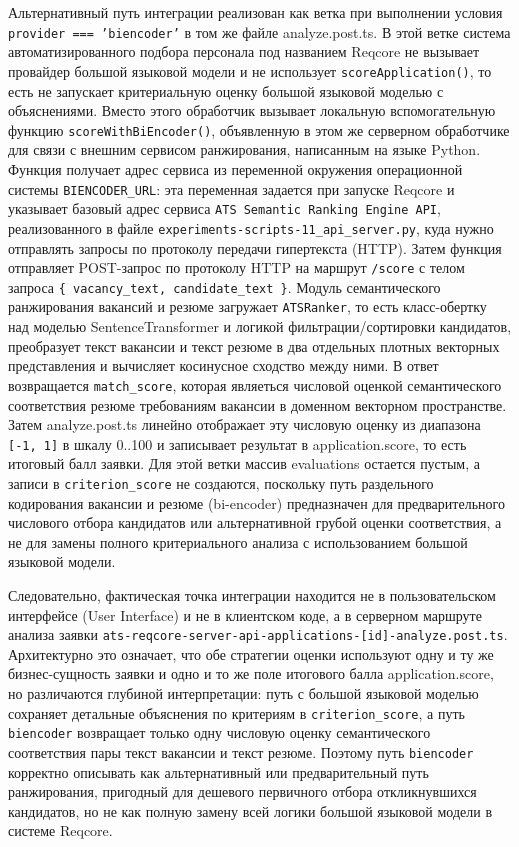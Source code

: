 Альтернативный путь интеграции реализован как ветка при выполнении условия \texttt{provider === 'biencoder'} в том же файле analyze.post.ts. В этой ветке система автоматизированного подбора персонала под названием Reqcore не вызывает провайдер большой языковой модели и не использует \texttt{scoreApplication()}, то есть не запускает критериальную оценку большой языковой моделью с объяснениями. Вместо этого обработчик вызывает локальную вспомогательную функцию \texttt{scoreWithBiEncoder()}, объявленную в этом же серверном обработчике для связи с внешним сервисом ранжирования, написанным на языке Python. Функция получает адрес сервиса из переменной окружения операционной системы \texttt{BIENCODER\_URL}: эта переменная задается при запуске Reqcore и указывает базовый адрес сервиса \texttt{ATS Semantic Ranking Engine API}, реализованного в файле \texttt{experiments-scripts-11\_api\_server.py}, куда нужно отправлять запросы по протоколу передачи гипертекста (HTTP). Затем функция отправляет POST-запрос по протоколу HTTP на маршрут \texttt{{\slash}score} с телом запроса \texttt{\{ vacancy\_text, candidate\_text \}}. Модуль семантического ранжирования вакансий и резюме загружает \texttt{ATSRanker}, то есть класс-обертку над моделью SentenceTransformer и логикой фильтрации/сортировки кандидатов, преобразует текст вакансии и текст резюме в два отдельных плотных векторных представления и вычисляет косинусное сходство между ними. В ответ возвращается \texttt{match\_score}, которая являеться числовой оценкой семантического соответствия резюме требованиям вакансии в доменном векторном пространстве. Затем analyze.post.ts линейно отображает эту числовую оценку из диапазона \texttt{{[}-1, 1{]}} в шкалу 0..100 и записывает результат в application.score, то есть итоговый балл заявки. Для этой ветки массив evaluations остается пустым, а записи в \texttt{criterion\_score} не создаются, поскольку путь раздельного кодирования вакансии и резюме (bi-encoder) предназначен для предварительного числового отбора кандидатов или альтернативной грубой оценки соответствия, а не для замены полного критериального анализа с использованием большой языковой модели.

Следовательно, фактическая точка интеграции находится не в пользовательском интерфейсе (User Interface) и не в клиентском коде, а в серверном маршруте анализа заявки \texttt{ats-reqcore-server-api-applications-{[}id{]}-analyze.post.ts}. Архитектурно это означает, что обе стратегии оценки используют одну и ту же бизнес-сущность заявки и одно и то же поле итогового балла application.score, но различаются глубиной интерпретации: путь с большой языковой моделью сохраняет детальные объяснения по критериям в \texttt{criterion\_score}, а путь \texttt{biencoder} возвращает только одну числовую оценку семантического соответствия пары текст вакансии и текст резюме. Поэтому путь \texttt{biencoder} корректно описывать как альтернативный или предварительный путь ранжирования, пригодный для дешевого первичного отбора откликнувшихся кандидатов, но не как полную замену всей логики большой языковой модели в системе Reqcore.

